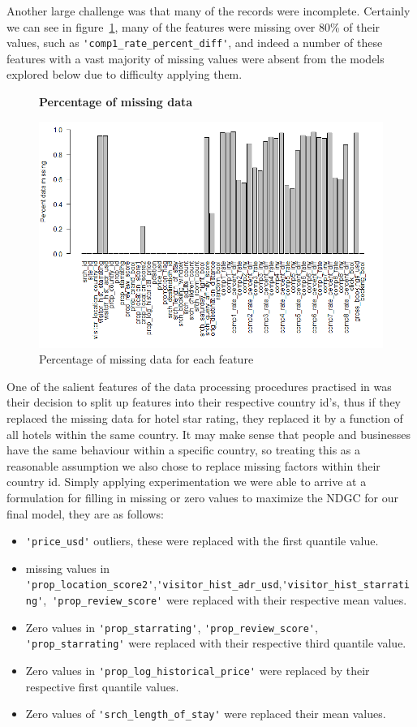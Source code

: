\documentclass{llncs}
\begin{document}
	Another large challenge was that many of the records were incomplete. Certainly we can see in figure~\ref{fig:pctM}, many of the features were missing over 80\% of their values, such as \verb!'comp1_rate_percent_diff'!, and indeed a number of these features with a vast majority of missing values were absent from the models explored below due to difficulty applying them.
	
    \begin{figure}
	\centering
	\textbf{Percentage of missing data}\par\medskip
		\includegraphics[scale=0.4]{figures/pct_missing.png}
	\caption{Percentage of missing data for each feature}
	\label{fig:pctM}
	\end{figure}


	One of the salient features of the data processing procedures practised in \cite{DBLP:journals/corr/LiuXZYPLSW13} was their decision to split up features into their respective country id's, thus if they replaced the missing data for hotel star rating, they replaced it by a function of all hotels within the same country. It may make sense that people and businesses have the same behaviour within a specific country, so treating this as a reasonable assumption we also chose to replace missing factors within their country id. Simply applying experimentation we were able to arrive at a formulation for filling in missing or zero values to maximize the NDGC for our final model, they are as follows:
	\begin{itemize}
	\item \verb!'price_usd'! outliers, these were replaced with the first quantile value.
	\item missing values in \verb!'prop_location_score2'!,\verb!'visitor_hist_adr_usd!,\verb!'visitor_hist_starrating'!,\ \verb!'prop_review_score'! were replaced with their respective mean values. 
	\item Zero values in \verb!'prop_starrating'!, \verb!'prop_review_score'!, \verb!'prop_starrating'! were replaced with their respective third quantile value.
	\item Zero values in \verb!'prop_log_historical_price'! were replaced by their respective first quantile values. 
	\item Zero values of \verb!'srch_length_of_stay'! were replaced their mean values.
	\end{itemize}
\end{document}
